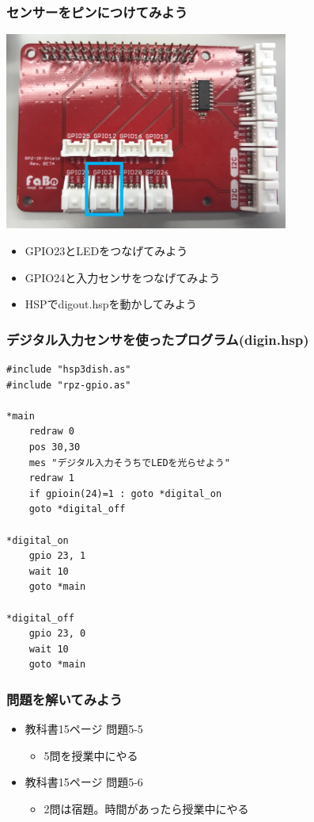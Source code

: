 \begin{frame}
    \frametitle{センサーをピンにつけてみよう}
    \begin{center}
        \includegraphics[width=0.7\textwidth]{images/chap05/text05-img029.png}
        \begin{itemize}
            \item GPIO23とLEDをつなげてみよう
            \item GPIO24と入力センサをつなげてみよう
            \item HSPでdigout.hspを動かしてみよう
        \end{itemize}
    \end{center}
\end{frame}

\begin{frame}[fragile]
    \frametitle{デジタル入力センサを使ったプログラム(digin.hsp)}
\begin{lstlisting}
#include "hsp3dish.as"
#include "rpz-gpio.as"

*main
	redraw 0
	pos 30,30
	mes "デジタル入力そうちでLEDを光らせよう"
	redraw 1
	if gpioin(24)=1 : goto *digital_on
	goto *digital_off
        
*digital_on
	gpio 23, 1
	wait 10
	goto *main

*digital_off
	gpio 23, 0
	wait 10
	goto *main 
\end{lstlisting}
\end{frame}

\begin{frame}[fragile]
    \frametitle{問題を解いてみよう}
    \begin{itemize}
        \item 教科書15ページ 問題5-5
        \begin{itemize}
            \item 5問を授業中にやる
        \end{itemize}
        \item 教科書15ページ 問題5-6
        \begin{itemize}
            \item 2問は宿題。時間があったら授業中にやる
        \end{itemize}

    \end{itemize}
\end{frame}